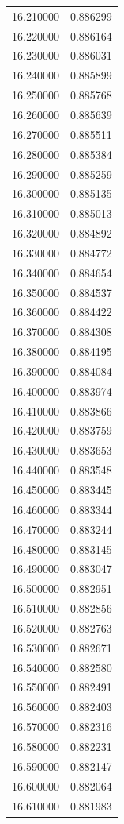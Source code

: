 \begin{tabular}{rr}
16.210000 & 0.886299 \\
16.220000 & 0.886164 \\
16.230000 & 0.886031 \\
16.240000 & 0.885899 \\
16.250000 & 0.885768 \\
16.260000 & 0.885639 \\
16.270000 & 0.885511 \\
16.280000 & 0.885384 \\
16.290000 & 0.885259 \\
16.300000 & 0.885135 \\
16.310000 & 0.885013 \\
16.320000 & 0.884892 \\
16.330000 & 0.884772 \\
16.340000 & 0.884654 \\
16.350000 & 0.884537 \\
16.360000 & 0.884422 \\
16.370000 & 0.884308 \\
16.380000 & 0.884195 \\
16.390000 & 0.884084 \\
16.400000 & 0.883974 \\
16.410000 & 0.883866 \\
16.420000 & 0.883759 \\
16.430000 & 0.883653 \\
16.440000 & 0.883548 \\
16.450000 & 0.883445 \\
16.460000 & 0.883344 \\
16.470000 & 0.883244 \\
16.480000 & 0.883145 \\
16.490000 & 0.883047 \\
16.500000 & 0.882951 \\
16.510000 & 0.882856 \\
16.520000 & 0.882763 \\
16.530000 & 0.882671 \\
16.540000 & 0.882580 \\
16.550000 & 0.882491 \\
16.560000 & 0.882403 \\
16.570000 & 0.882316 \\
16.580000 & 0.882231 \\
16.590000 & 0.882147 \\
16.600000 & 0.882064 \\
16.610000 & 0.881983 \\

\end{tabular}

